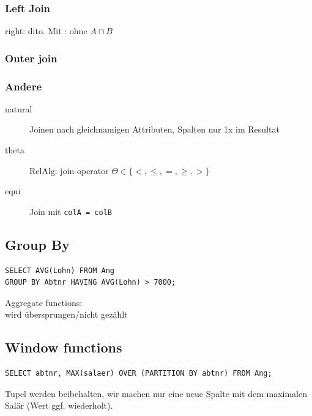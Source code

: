 \begin{multicols*}{3}
\subsubsection{Left Join}
right: dito.
Mit : ohne $A \cap B$

\subsubsection{Outer join}

\subsubsection{Andere}
\begin{description}
\item[natural]{Joinen nach gleichnamigen Attributen, Spalten nur 1x im Resultat}
\item[theta]{RelAlg: join-operator $\Theta \in \{<, \leq, =, \geq, >\}$}
\item[equi]{Join mit \verb|colA = colB|}
\end{description}

\subsection{Group By}
\begin{verbatim}
SELECT AVG(Lohn) FROM Ang
GROUP BY Abtnr HAVING AVG(Lohn) > 7000;
\end{verbatim}

Aggregate functions:  \\
 wird übersprungen/nicht gezählt

\subsection{Window functions}
\begin{verbatim}
SELECT abtnr, MAX(salaer) OVER (PARTITION BY abtnr) FROM Ang;
\end{verbatim}

Tupel werden beibehalten, wir machen nur eine neue Spalte mit dem maximalen
Salär (Wert ggf. wiederholt).


\end{multicols*}
